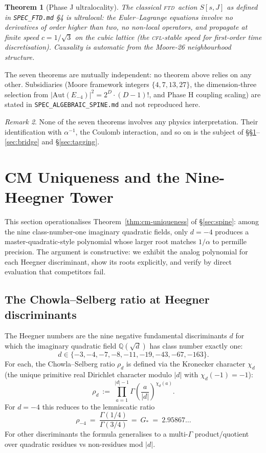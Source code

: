 \documentclass[11pt,reqno]{amsart}
\theoremstyle{plain}
\newtheorem{theorem}{Theorem}[section]
\theoremstyle{definition}
\theoremstyle{remark}
\newtheorem{remark}[theorem]{Remark}
\numberwithin{equation}{section}
\newcommand{\Gstar}{G_{\!*}}
\newcommand{\FTD}{\textsc{ftd}}
\begin{document}
\begin{theorem}[Phase J ultralocality]
\label{thm:phasej}
The classical \FTD\ action $S[s, J]$ as defined in
\texttt{SPEC\_FTD.md} \S 4 is ultralocal: the Euler--Lagrange equations
involve no derivatives of order higher than two, no non-local
operators, and propagate at finite speed $c = 1/\sqrt{3}$ on the
cubic lattice (the \textsc{cfl}-stable speed for first-order time
discretisation). Causality is automatic from the Moore-26 neighbourhood
structure.
\end{theorem}

The seven theorems are mutually independent: no theorem above relies
on any other. Subsidiaries (Moore framework integers $\{4, 7, 13, 27\}$,
the dimension-three selection from $|\mathrm{Aut}(E_{-4})|^{2} =
2^{D}\cdot(D{-}1)!$, and Phase H coupling scaling) are stated in
\texttt{SPEC\_ALGEBRAIC\_SPINE.md} and not reproduced here.

\begin{remark}
None of the seven theorems involves any physics interpretation. Their
identification with $\alpha^{-1}$, the Coulomb interaction,
and so on is the subject of \S\S\ref{sec:cm-uniqueness}--\ref{sec:bridge}
and \S\ref{sec:tagging}.
\end{remark}

\section{CM Uniqueness and the Nine-Heegner Tower}
\label{sec:cm-uniqueness}

This section operationalises Theorem~\ref{thm:cm-uniqueness} of
\S\ref{sec:spine}: among the nine class-number-one imaginary
quadratic fields, only $d = -4$ produces a master-quadratic-style
polynomial whose larger root matches $1/\alpha$ to permille precision. The argument is constructive: we exhibit the
analog polynomial for each Heegner discriminant, show its roots
explicitly, and verify by direct evaluation that competitors fail.

\subsection{The Chowla--Selberg ratio at Heegner discriminants}

The Heegner numbers are the nine negative fundamental discriminants
$d$ for which the imaginary quadratic field $\mathbb{Q}(\sqrt{d})$
has class number exactly one:
\[
  d \in \{-3, -4, -7, -8, -11, -19, -43, -67, -163\}.
\]
For each, the Chowla--Selberg ratio $\rho_{d}$ is defined via the
Kronecker character $\chi_{d}$ (the unique primitive real Dirichlet
character modulo $|d|$ with $\chi_{d}(-1) = -1$):
\[
  \rho_{d}\ :=\ \prod_{a=1}^{|d|-1}
    \Gamma\!\left(\frac{a}{|d|}\right)^{\chi_{d}(a)}.
\]
For $d = -4$ this reduces to the lemniscatic ratio
\[
  \rho_{-4}\ =\ \frac{\Gamma(1/4)}{\Gamma(3/4)}\ =\ \Gstar
  \ =\ 2.95867\ldots
\]
For other discriminants the formula generalises to a multi-$\Gamma$
product/quotient over quadratic residues vs non-residues mod $|d|$.
\end{document}
